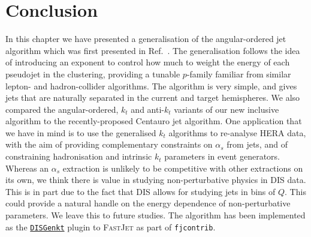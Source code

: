 \section{Conclusion}
\label{sec:concl}
In this chapter we have presented a generalisation of the
angular-ordered jet algorithm which was first presented in
Ref.~\cite{vanBeekveld:2023chs}.  The generalisation follows the idea
of introducing an exponent to control how much to weight the energy of
each pseudojet in the clustering, providing a tunable $p$-family
familiar from similar lepton- and hadron-collider algorithms. The
algorithm is very simple, and gives jets that are naturally separated
in the current and target hemispheres.  We also compared the
angular-ordered, $k_t$ and anti-$k_t$ variants of our new inclusive
algorithm to the recently-proposed Centauro jet algorithm. One
application that we have in mind is to use the generalised $k_t$
algorithms to re-analyse HERA data, with the aim of providing
complementary constraints on \(\alpha_s\) from jets, and of
constraining hadronisation and intrinsic $k_t$ parameters in event
generators. Whereas an $\alpha_s$ extraction is unlikely to be
competitive with other extractions on its own, we think there is value
in studying non-perturbative physics in DIS data. This is in part due
to the fact that DIS allows for studying jets in bins of $Q$. This
could provide a natural handle on the energy dependence of
non-perturbative parameters. We leave this to future studies.
%
The algorithm has been implemented as the \href{https://repo.hepforge.org/source/fastjetsvn/browse/contrib/contribs/DISGenkt}{\texttt{DISGenkt}} plugin to
\textsc{FastJet} as part of \texttt{fjcontrib}.
